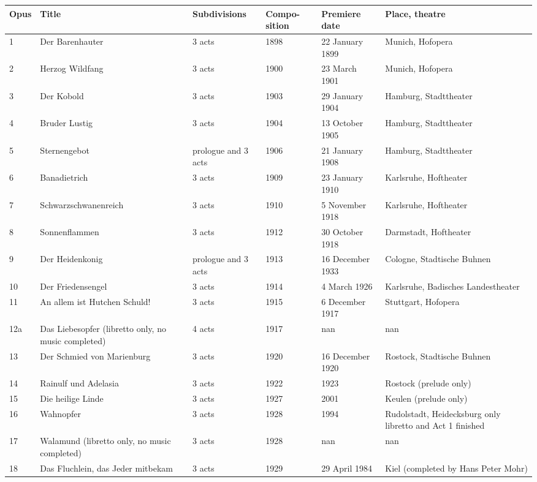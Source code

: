 \documentclass{article}
\begin{document}
\begin{tabular}{llllll}
\toprule
Opus & Title & Subdivisions & Compo-sition & Premiere date & Place, theatre \\
\midrule
1 & Der Barenhauter & 3 acts & 1898 & 22 January 1899 & Munich, Hofopera \\
2 & Herzog Wildfang & 3 acts & 1900 & 23 March 1901 & Munich, Hofopera \\
3 & Der Kobold & 3 acts & 1903 & 29 January 1904 & Hamburg, Stadttheater \\
4 & Bruder Lustig & 3 acts & 1904 & 13 October 1905 & Hamburg, Stadttheater \\
5 & Sternengebot & prologue and 3 acts & 1906 & 21 January 1908 & Hamburg, Stadttheater \\
6 & Banadietrich & 3 acts & 1909 & 23 January 1910 & Karlsruhe, Hoftheater \\
7 & Schwarzschwanenreich & 3 acts & 1910 & 5 November 1918 & Karlsruhe, Hoftheater \\
8 & Sonnenflammen & 3 acts & 1912 & 30 October 1918 & Darmstadt, Hoftheater \\
9 & Der Heidenkonig & prologue and 3 acts & 1913 & 16 December 1933 & Cologne, Stadtische Buhnen \\
10 & Der Friedensengel & 3 acts & 1914 & 4 March 1926 & Karlsruhe, Badisches Landestheater \\
11 & An allem ist Hutchen Schuld! & 3 acts & 1915 & 6 December 1917 & Stuttgart, Hofopera \\
12a & Das Liebesopfer (libretto only, no music completed) & 4 acts & 1917 & nan & nan \\
13 & Der Schmied von Marienburg & 3 acts & 1920 & 16 December 1920 & Rostock, Stadtische Buhnen \\
14 & Rainulf und Adelasia & 3 acts & 1922 & 1923 & Rostock (prelude only) \\
15 & Die heilige Linde & 3 acts & 1927 & 2001 & Keulen (prelude only) \\
16 & Wahnopfer & 3 acts & 1928 & 1994 & Rudolstadt, Heidecksburg only libretto and Act 1 finished \\
17 & Walamund (libretto only, no music completed) & 3 acts & 1928 & nan & nan \\
18 & Das Fluchlein, das Jeder mitbekam & 3 acts & 1929 & 29 April 1984 & Kiel (completed by Hans Peter Mohr) \\
\bottomrule
\end{tabular}
\end{document}
